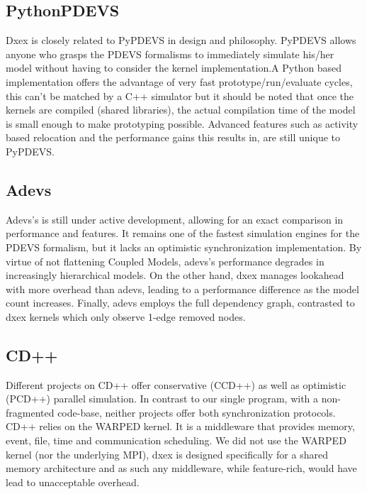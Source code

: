 \subsection{PythonPDEVS}
Dxex is closely related to PyPDEVS in design and philosophy. PyPDEVS allows anyone who grasps the PDEVS formalisms to immediately simulate his/her model without having to consider the kernel implementation.A Python based implementation offers the advantage of very fast prototype/run/evaluate cycles, this can't be matched by a C++ simulator but it should be noted that once the kernels are compiled (shared libraries), the actual compilation time of the model is small enough to make prototyping possible.
Advanced features such as activity based relocation and the performance gains this results in, are still unique to PyPDEVS.
\subsection{Adevs}
Adevs's is still under active development, allowing for an exact comparison in performance and features. It remains one of the fastest simulation engines for the PDEVS formalism, but it lacks an optimistic synchronization implementation. %
By virtue of not flattening Coupled Models, adevs's performance degrades in increasingly hierarchical models. On the other hand, dxex manages lookahead with more overhead than adevs, leading to a performance difference as the model count increases. Finally, adevs employs the full dependency graph, contrasted to dxex kernels which only observe 1-edge removed nodes. 
\subsection{CD++}
Different projects on CD++ offer conservative (CCD++) as well as optimistic (PCD++) parallel simulation. In contrast to our single program, with a non-fragmented code-base, neither projects offer both synchronization protocols. CD++ relies on the WARPED kernel. It is a middleware that provides memory, event, file, time and communication scheduling. We did not use the WARPED kernel (nor the underlying MPI), dxex is designed specifically for a shared memory architecture and as such any middleware, while feature-rich, would have lead to unacceptable overhead.
